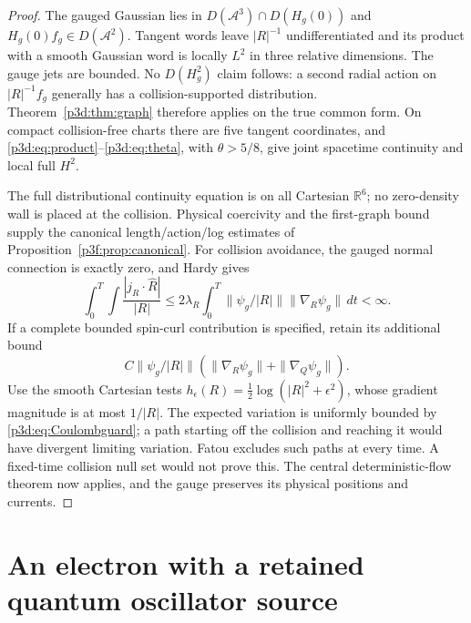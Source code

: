 \documentclass[11pt]{article}
\numberwithin{equation}{section}
\theoremstyle{definition}
\theoremstyle{remark}
\begin{document}
\begin{proof}
The gauged Gaussian lies in $D(\mathcal A^3)\cap D(H_g(0))$ and
$H_g(0)f_g\in D(\mathcal A^2)$. Tangent words leave $|R|^{-1}$
undifferentiated and its product with a smooth Gaussian word is locally
$L^2$ in three relative dimensions. The gauge jets are bounded.
No $D(H_g^2)$ claim follows: a second radial action on
$|R|^{-1}f_g$ generally has a collision-supported distribution.
Theorem~\ref{p3d:thm:graph} therefore applies on the true common form.
On compact collision-free charts there are five tangent coordinates,
and \eqref{p3d:eq:product}--\eqref{p3d:eq:theta}, with
$\theta>5/8$, give joint spacetime continuity and local full $H^2$.

The full distributional continuity equation is on all Cartesian
$\mathbb R^6$; no zero-density wall is placed at the collision.
Physical coercivity and the first-graph bound supply the canonical
length/action/log estimates of Proposition~\ref{p3f:prop:canonical}.
For collision avoidance, the gauged normal connection is exactly zero,
and Hardy gives
\begin{equation}\label{p3d:eq:Coulombguard}
 \int_0^T\!\int\frac{|j_R\cdot\widehat R|}{|R|}
 \leq2\lambda_R\int_0^T
          \|\psi_g/|R|\|\|\nabla_R\psi_g\|\,dt<\infty.
\end{equation}
If a complete bounded spin-curl contribution is specified, retain
its additional bound
\[
 C\|\psi_g/|R|\|(\|\nabla_R\psi_g\|+\|\nabla_Q\psi_g\|).
\]
Use the smooth Cartesian tests
$h_\epsilon(R)=\frac12\log(|R|^2+\epsilon^2)$, whose gradient magnitude
is at most $1/|R|$. The expected variation is uniformly bounded by
\eqref{p3d:eq:Coulombguard}; a path starting off the collision and
reaching it would have divergent limiting variation. Fatou excludes
such paths at every time. A fixed-time collision null set would not
prove this. The central deterministic-flow theorem now applies, and
the gauge preserves its physical positions and currents.
\end{proof}

\section{An electron with a retained quantum oscillator source}
\label{p3d:sec:HQA}
\end{document}
